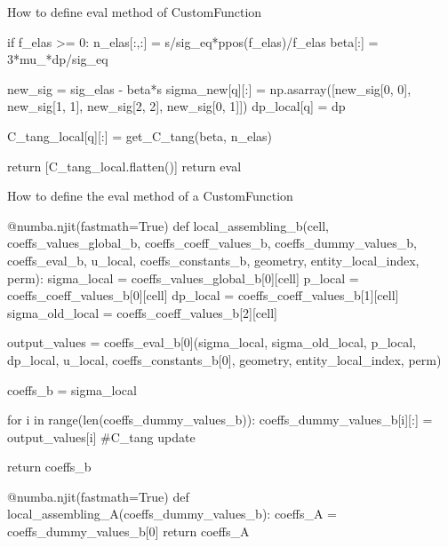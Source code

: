 \documentclass[9pt]{beamer}
\begin{document}
\begin{frame}[fragile]{How to define eval method of CustomFunction}
\begin{pythoncode}
            if f_elas >= 0:
                n_elas[:,:] = s/sig_eq*ppos(f_elas)/f_elas 
                beta[:] = 3*mu_*dp/sig_eq                 
            
            new_sig = sig_elas - beta*s
            sigma_new[q][:] = np.asarray([new_sig[0, 0], new_sig[1, 1], new_sig[2, 2], new_sig[0, 1]])
            dp_local[q] = dp
            
            C_tang_local[q][:] = get_C_tang(beta, n_elas)
        
        return [C_tang_local.flatten()] 
    return eval
  \end{pythoncode}
\end{frame}

\begin{frame}[fragile]{How to define the eval method of a CustomFunction}
  \begin{pythoncode}
    @numba.njit(fastmath=True)
    def local_assembling_b(cell, coeffs_values_global_b, coeffs_coeff_values_b, coeffs_dummy_values_b, coeffs_eval_b, u_local, coeffs_constants_b, geometry, entity_local_index, perm):
        sigma_local = coeffs_values_global_b[0][cell]
        p_local = coeffs_coeff_values_b[0][cell]
        dp_local = coeffs_coeff_values_b[1][cell]
        sigma_old_local = coeffs_coeff_values_b[2][cell]

        output_values = coeffs_eval_b[0](sigma_local, 
                                            sigma_old_local,
                                            p_local,
                                            dp_local,
                                            u_local, 
                                            coeffs_constants_b[0], 
                                            geometry, entity_local_index, perm)

        coeffs_b = sigma_local

        for i in range(len(coeffs_dummy_values_b)):
            coeffs_dummy_values_b[i][:] = output_values[i] #C_tang update

        return coeffs_b
  \end{pythoncode}

  \begin{pythoncode}
    @numba.njit(fastmath=True)
    def local_assembling_A(coeffs_dummy_values_b):
        coeffs_A = coeffs_dummy_values_b[0]
        return coeffs_A
  \end{pythoncode}

\end{frame}
\end{document}
